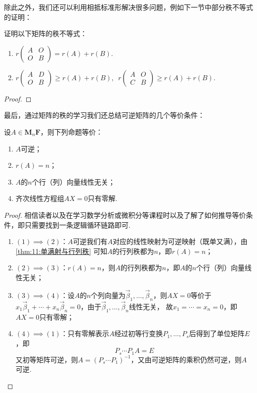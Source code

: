 除此之外，我们还可以利用相抵标准形解决很多问题，例如下一节中部分秩不等式的证明：
\begin{example}\label{ex:11:分块秩不等式}
    证明以下矩阵的秩不等式：
    \begin{enumerate}
        \item $r\begin{pmatrix}
            A & O \\ O & B
        \end{pmatrix}=r(A)+r(B)$.

        \item $r\begin{pmatrix}
            A & D \\ O & B
        \end{pmatrix}\geqslant r(A)+r(B),\enspace r\begin{pmatrix}
            A & O \\ C & B
        \end{pmatrix}\geqslant r(A)+r(B)$.
    \end{enumerate}
\end{example}
\begin{proof}

\end{proof}

最后，通过矩阵的秩的学习我们还总结可逆矩阵的几个等价条件：
\begin{theorem}
    设$A \in \mathbf{M}_n{\mathbf{F}}$，则下列命题等价：
    \begin{enumerate}
        \item $A$可逆；

        \item $r(A)=n$；

        \item $A$的$n$个行（列）向量线性无关；

        \item 齐次线性方程组$AX=0$只有零解.
    \end{enumerate}
\end{theorem}
\begin{proof}
    相信读者以及在学习数学分析或微积分等课程时以及了解了如何推导等价条件，即只需要找到一条逻辑循环链路即可.
    \begin{enumerate}
        \item $(1)\implies(2)$：$A$可逆我们有$A$对应的线性映射为可逆映射（既单又满），由\autoref{thm:11:单满射与行列秩}
        可知$A$的行列秩都为$n$，即$r(A)=n$；
        \item $(2)\implies(3)$：$r(A)=n$，则$A$的行列秩都为$n$，即$A$的$n$个行（列）向量线性无关；
        \item $(3)\implies(4)$：设$A$的$n$个列向量为$\vec{\beta}_1,\ldots,\vec{\beta}_n$，则$AX=0$等价于
        $x_1\vec{\beta}_1+\cdots+x_n\vec{\beta}_n=0$，由于$\vec{\beta}_1,\ldots,\vec{\beta}_n$线性无关，
        故$x_1=\cdots=x_n=0$，即$AX=0$只有零解；
        \item $(4)\implies(1)$：只有零解表示$A$经过初等行变换$P_1,\ldots,P_s$后得到了单位矩阵$E$，即
        \[P_s\cdots P_1A=E\]
        又初等矩阵可逆，则$A=(P_s\cdots P_1)^{-1}$，又由可逆矩阵的乘积仍然可逆，则$A$可逆.
    \end{enumerate}
\end{proof}

